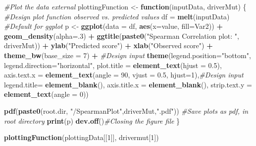 \documentclass[]{article}
\newenvironment{Shaded}{\begin{snugshade}}{\end{snugshade}}
\newcommand{\CommentTok}[1]{\textcolor[rgb]{0.56,0.35,0.01}{\textit{#1}}}
\newcommand{\ControlFlowTok}[1]{\textcolor[rgb]{0.13,0.29,0.53}{\textbf{#1}}}
\newcommand{\DataTypeTok}[1]{\textcolor[rgb]{0.13,0.29,0.53}{#1}}
\newcommand{\DecValTok}[1]{\textcolor[rgb]{0.00,0.00,0.81}{#1}}
\newcommand{\FloatTok}[1]{\textcolor[rgb]{0.00,0.00,0.81}{#1}}
\newcommand{\KeywordTok}[1]{\textcolor[rgb]{0.13,0.29,0.53}{\textbf{#1}}}
\newcommand{\NormalTok}[1]{#1}
\newcommand{\OperatorTok}[1]{\textcolor[rgb]{0.81,0.36,0.00}{\textbf{#1}}}
\newcommand{\StringTok}[1]{\textcolor[rgb]{0.31,0.60,0.02}{#1}}
\begin{document}
\begin{Shaded}
\begin{Highlighting}[]
\CommentTok{#Plot the data external }
\NormalTok{plottingFunction <-}\StringTok{ }\ControlFlowTok{function}\NormalTok{(inputData, driverMut) \{ }\CommentTok{#Design plot function observed vs. predicted values}
\NormalTok{  df =}\StringTok{ }\KeywordTok{melt}\NormalTok{(inputData) }\CommentTok{#Default for ggplot}
\NormalTok{  p <-}\StringTok{ }\KeywordTok{ggplot}\NormalTok{(}\DataTypeTok{data =}\NormalTok{ df, }\KeywordTok{aes}\NormalTok{(}\DataTypeTok{x=}\NormalTok{value, }\DataTypeTok{fill=}\NormalTok{Var2)) }\OperatorTok{+}\StringTok{ }
\StringTok{    }\KeywordTok{geom_density}\NormalTok{(}\DataTypeTok{alpha=}\NormalTok{.}\DecValTok{3}\NormalTok{) }\OperatorTok{+}
\StringTok{    }\KeywordTok{ggtitle}\NormalTok{(}\KeywordTok{paste0}\NormalTok{(}\StringTok{"Spearman Correlation plot: "}\NormalTok{, driverMut)) }\OperatorTok{+}
\StringTok{    }\KeywordTok{ylab}\NormalTok{(}\StringTok{"Predicted score"}\NormalTok{) }\OperatorTok{+}
\StringTok{    }\KeywordTok{xlab}\NormalTok{(}\StringTok{"Observed score"}\NormalTok{) }\OperatorTok{+}
\StringTok{    }\KeywordTok{theme_bw}\NormalTok{(}\DataTypeTok{base_size =} \DecValTok{7}\NormalTok{) }\OperatorTok{+}\StringTok{ }\CommentTok{#Design input}
\StringTok{    }\KeywordTok{theme}\NormalTok{(}\DataTypeTok{legend.position=}\StringTok{"bottom"}\NormalTok{,}
          \DataTypeTok{legend.direction=}\StringTok{"horizontal"}\NormalTok{,}
          \DataTypeTok{plot.title =} \KeywordTok{element_text}\NormalTok{(}\DataTypeTok{hjust =} \FloatTok{0.5}\NormalTok{),}
          \DataTypeTok{axis.text.x =} \KeywordTok{element_text}\NormalTok{(}\DataTypeTok{angle =} \DecValTok{90}\NormalTok{, }\DataTypeTok{vjust =} \FloatTok{0.5}\NormalTok{, }\DataTypeTok{hjust=}\DecValTok{1}\NormalTok{),}\CommentTok{#Design input}
          \DataTypeTok{legend.title=} \KeywordTok{element_blank}\NormalTok{(),}
          \DataTypeTok{axis.title.x =} \KeywordTok{element_blank}\NormalTok{(),}
          \DataTypeTok{strip.text.y =} \KeywordTok{element_text}\NormalTok{(}\DataTypeTok{angle =} \DecValTok{0}\NormalTok{))}
  
  \KeywordTok{pdf}\NormalTok{(}\KeywordTok{paste0}\NormalTok{(root.dir, }\StringTok{"/SpearmanPlot"}\NormalTok{,driverMut,}\StringTok{".pdf"}\NormalTok{)) }\CommentTok{#Save plots as pdf, in root directory}
  \KeywordTok{print}\NormalTok{(p)}
  \KeywordTok{dev.off}\NormalTok{()}\CommentTok{#Closing the figure file}
\NormalTok{\}}

\KeywordTok{plottingFunction}\NormalTok{(plottingData[[}\DecValTok{1}\NormalTok{]], drivermut[}\DecValTok{1}\NormalTok{])}
\end{Highlighting}
\end{Shaded}
\end{document}
